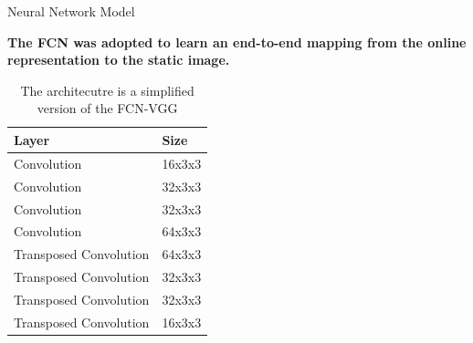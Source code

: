 \documentclass{beamer}
\begin{document}
\begin{frame}{Neural Network Model}


\textbf{The FCN was adopted to learn an end-to-end mapping from the online representation to the static image. }
\vskip 0.06cm
\begin{table}[!htb]
\renewcommand{\arraystretch}{1.3}
\caption{The architecutre is a simplified version of the FCN-VGG \parencite{long2015fully, simonyan2014very} }
\centering
\begin{tabular}{|l|l|}
\hline
\textbf{Layer}        & \textbf{Size} \\ \hline
Convolution           & 16x3x3        \\ \hline
Convolution           & 32x3x3        \\ \hline
Convolution           & 32x3x3        \\ \hline
Convolution           & 64x3x3        \\ \hline
Transposed Convolution & 64x3x3        \\ \hline
Transposed Convolution & 32x3x3        \\ \hline
Transposed Convolution & 32x3x3        \\ \hline
Transposed Convolution & 16x3x3        \\ \hline
\end{tabular}
\label{table:cnn-arch}
\end{table}


\end{frame}
\end{document}
